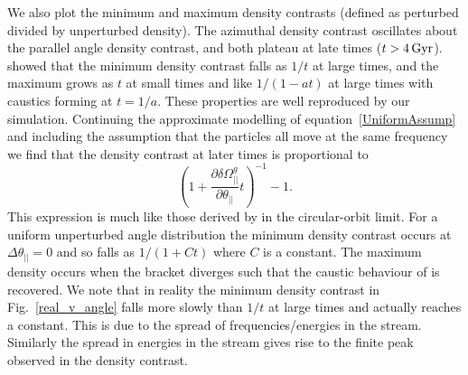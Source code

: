 \documentclass[useAMS,usenatbib,fleqn,a4paper]{mn2e}
\def\Gyr{\,{\rm Gyr}}
\begin{document}
We also plot the minimum and maximum density contrasts (defined as perturbed divided by unperturbed density). The azimuthal density contrast oscillates about the parallel angle density contrast, and both plateau at late times ($t>4\Gyr$). \cite{ErkalBelokurov2015} showed that the minimum density contrast falls as $1/t$ at large times, and the maximum grows as $t$ at small times and like $1/(1-at)$ at large times with caustics forming at $t=1/a$. These properties are well reproduced by our simulation. Continuing the approximate modelling of equation~\eqref{UniformAssump} and including the assumption that the particles all move at the same frequency we find that the density contrast at later times is proportional to
\begin{equation}
(1+\frac{\partial\delta\Omega^g_{||}}{\partial\theta_{||}}t)^{-1}-1.
\label{densitycontrast}
\end{equation}
This expression is much like those derived by \cite{ErkalBelokurov2015} in the circular-orbit limit. For a uniform unperturbed angle distribution the minimum density contrast occurs at $\Delta\theta_{||}=0$ and so falls as $1/(1+Ct)$ where $C$ is a constant. The maximum density occurs when the bracket diverges such that the caustic behaviour of \cite{ErkalBelokurov2015} is recovered. We note that in reality the minimum density contrast in Fig.~\ref{real_v_angle} falls more slowly than $1/t$ at large times and actually reaches a constant. This is due to the spread of frequencies/energies in the stream. Similarly the spread in energies in the stream gives rise to the finite peak observed in the density contrast.
\end{document}
